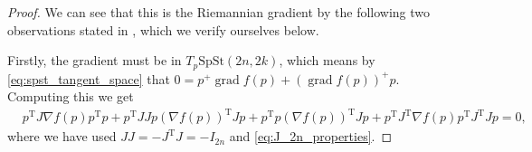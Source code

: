 \begin{proof}
    We can see that this is the Riemannian gradient by the following two observations stated in \cite[p.~12]{BendokatZimmermann2021}, which we verify ourselves below.

    Firstly, the gradient must be in $T_{p}\mathrm{SpSt}(2n, 2k)$, which means by \eqref{eq:spst_tangent_space} that $0=p^{+}\operatorname{grad}f(p)+(\operatorname{grad}f(p))^{+}p$. Computing this we get 
    \begin{equation*}
        \begin{split}
        &p^{\mathrm{T}}J\nabla f(p)p^{\mathrm{T}}p+p^{\mathrm{T}}JJp(\nabla f(p))^{\mathrm{T}}Jp+p^{\mathrm{T}}p(\nabla f(p))^{\mathrm{T}}Jp+p^{\mathrm{T}}J^{\mathrm{T}}\nabla f(p)p^{\mathrm{T}}J^{\mathrm{T}}Jp=0,
        \end{split}
    \end{equation*}
    where we have used $JJ=-J^{\mathrm{T}}J=-I_{2n}$ and \eqref{eq:J_2n_properties}.
    

\end{proof}
